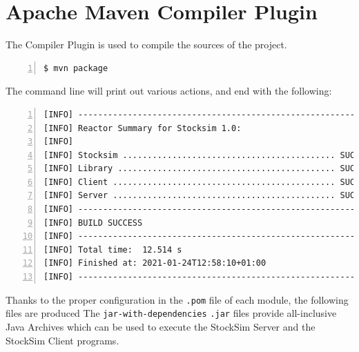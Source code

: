 \section{Apache Maven Compiler Plugin}
The Compiler Plugin is used to compile the sources of the project.
\vspace{0.2cm}
\begin{lstlisting}[basicstyle=\footnotesize\ttfamily,language={},numbers=left,
keepspaces=true,tabsize=4,numberstyle=\footnotesize,numbersep=8pt,frame=single]
$ mvn package
\end{lstlisting}
\vspace{-0.3cm}
The command line will print out various actions, and end with the following:
\vspace{0.2cm}
\begin{lstlisting}[basicstyle=\footnotesize\ttfamily,language={},numbers=left,
keepspaces=true,tabsize=4,numberstyle=\footnotesize,numbersep=8pt,frame=single]
[INFO] ------------------------------------------------------------------------
[INFO] Reactor Summary for Stocksim 1.0:
[INFO] 
[INFO] Stocksim ........................................... SUCCESS [  0.001 s]
[INFO] Library ............................................ SUCCESS [  0.820 s]
[INFO] Client ............................................. SUCCESS [  6.287 s]
[INFO] Server ............................................. SUCCESS [  5.337 s]
[INFO] ------------------------------------------------------------------------
[INFO] BUILD SUCCESS
[INFO] ------------------------------------------------------------------------
[INFO] Total time:  12.514 s
[INFO] Finished at: 2021-01-24T12:58:10+01:00
[INFO] ------------------------------------------------------------------------
\end{lstlisting}
Thanks to the proper configuration in the \texttt{.pom} file of each module,
the following files are produced
\vspace{0.2cm}
\vspace{0.2cm}
\noindent The \texttt{jar-with-dependencies} \texttt{.jar} files provide all-inclusive
Java Archives which can be used to execute the StockSim Server and the StockSim
Client programs.
